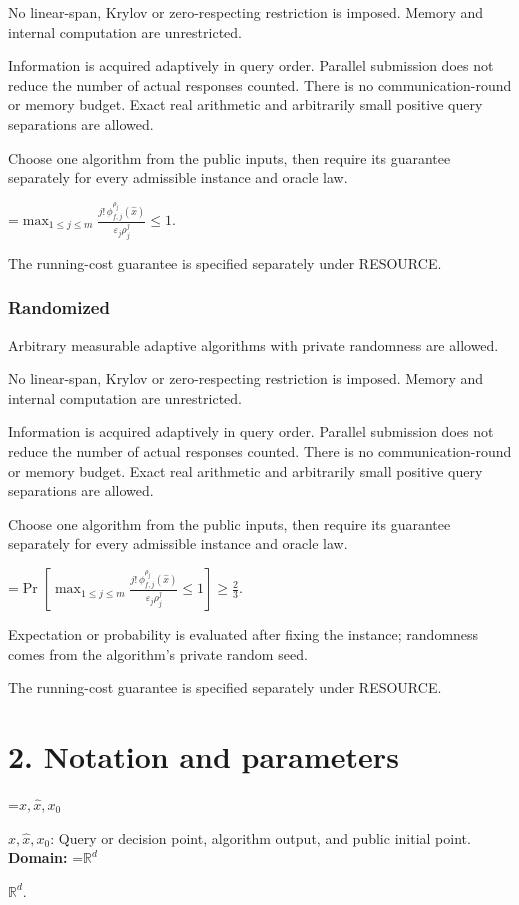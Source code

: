 \documentclass[10pt,a4paper]{article}
\newcommand{\AtlasMath}[1]{\par\begingroup\centering\setbox0=\hbox{$\displaystyle #1$}\ifdim\wd0>1.4\linewidth\typeout{ATLAS WIDE FORMULA: \the\wd0}\fi\ifdim\wd0>\linewidth\resizebox{\linewidth}{!}{\box0}\else\box0\fi\par\endgroup}
\newcommand{\AtlasInlineMath}[1]{\begingroup\setbox0=\hbox{$#1$}\ifdim\wd0>.4\linewidth\endgroup\AtlasMath{#1}\else\endgroup$#1$\fi}
\begin{document}
No linear-span, Krylov or zero-respecting restriction is imposed. Memory and internal computation are unrestricted.

Information is acquired adaptively in query order. Parallel submission does not reduce the number of actual responses counted. There is no communication-round or memory budget. Exact real arithmetic and arbitrarily small positive query separations are allowed.

Choose one algorithm from the public inputs, then require its guarantee separately for every admissible instance and oracle law.


\AtlasMath{\max_{1\le j\le m}\frac{j!\,\phi_{f,j}^{\rho_j}(\widehat{x})}{\varepsilon_j\rho_j^j}\le 1.}


The running-cost guarantee is specified separately under RESOURCE.

\subsubsection{Randomized}
Arbitrary measurable adaptive algorithms with private randomness are allowed.

No linear-span, Krylov or zero-respecting restriction is imposed. Memory and internal computation are unrestricted.

Information is acquired adaptively in query order. Parallel submission does not reduce the number of actual responses counted. There is no communication-round or memory budget. Exact real arithmetic and arbitrarily small positive query separations are allowed.

Choose one algorithm from the public inputs, then require its guarantee separately for every admissible instance and oracle law.


\AtlasMath{\Pr\!\left[\max_{1\le j\le m}\frac{j!\,\phi_{f,j}^{\rho_j}(\widehat{x})}{\varepsilon_j\rho_j^j}\le 1\right]\ge\frac23.}


Expectation or probability is evaluated after fixing the instance; randomness comes from the algorithm's private random seed.

The running-cost guarantee is specified separately under RESOURCE.

\section{2. Notation and parameters}
\AtlasInlineMath{x,\widehat{x},x_0}: Query or decision point, algorithm output, and public initial point. \textbf{Domain:} \AtlasInlineMath{\mathbb{R}^d}.
\end{document}
